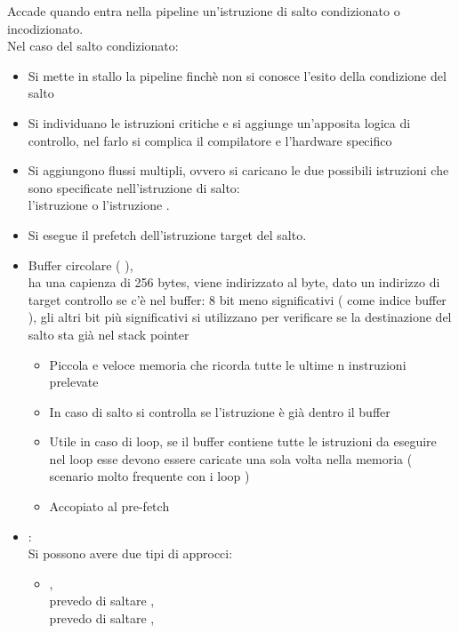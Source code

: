 \documentclass[arch.tex]{subfiles}
\begin{document}
%
\label{par:dipendenza_dal_controllo}
Accade quando entra nella pipeline un'istruzione di salto condizionato o incodizionato.\\
Nel caso del salto condizionato:

\begin{itemize}
	\item Si mette in stallo la pipeline finchè non si conosce l'esito 
		della condizione del salto
	\item Si individuano le istruzioni critiche e si aggiunge un'apposita logica
		di controllo, nel farlo si complica il compilatore e l'hardware specifico
	\item Si aggiungono flussi multipli, ovvero si caricano le due possibili istruzioni
		che sono specificate nell'istruzione di salto:\\
		l'istruzione  o l'istruzione .
	\item Si esegue il prefetch dell'istruzione target del salto.
	\item Buffer circolare (   ),\\
		ha una capienza di 256 bytes, viene indirizzato al byte, dato un indirizzo di 
		target controllo se c'è nel buffer: 8 bit meno significativi ( come indice 
		buffer ), gli altri bit più significativi si utilizzano per verificare se la 
		destinazione del salto sta già nel stack pointer
		\begin{itemize}
			\item Piccola e veloce memoria che ricorda tutte le ultime n
				instruzioni prelevate
			\item In caso di salto si controlla se l'istruzione 
				è già dentro il buffer
			\item Utile in caso di loop, se il buffer contiene tutte le istruzioni
				da eseguire nel loop esse devono essere caricate una sola 
				volta nella memoria ( scenario molto frequente con i loop )
			\item Accopiato al pre-fetch 
		\end{itemize}
	\item {}:\\
		Si possono avere due tipi di approcci:
		\begin{itemize}
			\item {},\\
				prevedo di saltare ,\\
				prevedo di  saltare ,\\

\end{itemize}
\end{itemize}
\end{document}
